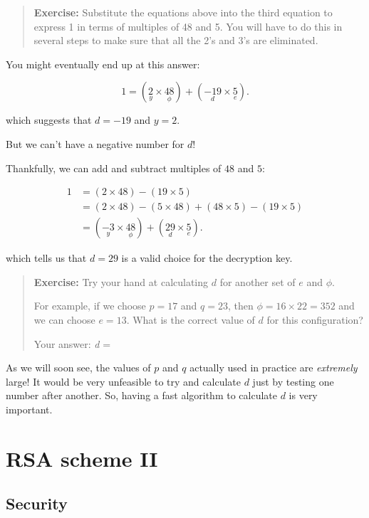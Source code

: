 \documentclass[
  letterpaper,
  DIV=11,
  numbers=noendperiod]{scrreprt}
\begin{document}
\begin{quote}
\textbf{Exercise:} Substitute the equations above into the third
equation to express 1 in terms of multiples of 48 and 5. You will have
to do this in several steps to make sure that all the 2's and 3's are
eliminated.
\end{quote}

You might eventually end up at this answer:

\[1 = (\underset{y}{2} \times \underset{\phi}{48}) + (\underset{d}{-19} \times \underset{e}{5}).\]

which suggests that \(d = -19\) and \(y = 2\).

But we can't have a negative number for \(d\)!

Thankfully, we can add and subtract multiples of \(48\) and \(5\):

\begin{align}
1 &= (2 \times 48) - (19 \times 5) \\
  &= (2 \times 48) - (5 \times 48) + (48 \times 5) - (19 \times 5) \\
  &= (\underset{y}{-3} \times \underset{\phi}{48}) + (\underset{d}{29} \times \underset{e}{5}).
\end{align}

which tells us that \(d = 29\) is a valid choice for the decryption key.

\begin{quote}
\textbf{Exercise:} Try your hand at calculating \(d\) for another set of
\(e\) and \(\phi\).

For example, if we choose \(p = 17\) and \(q = 23\), then
\(\phi = 16 \times 22 = 352\) and we can choose \(e = 13\). What is the
correct value of \(d\) for this configuration?

Your answer: \emph{d} = ~ ~~~~\protect\hypertarget{d-result}{}{}
\end{quote}

As we will soon see, the values of \(p\) and \(q\) actually used in
practice are \emph{extremely} large! It would be very unfeasible to try
and calculate \(d\) just by testing one number after another. So, having
a fast algorithm to calculate \(d\) is very important.

\hypertarget{rsa-scheme-ii}{%
\chapter{RSA scheme II}\label{rsa-scheme-ii}}

\hypertarget{security}{%
\section{Security}\label{security}}
\end{document}
